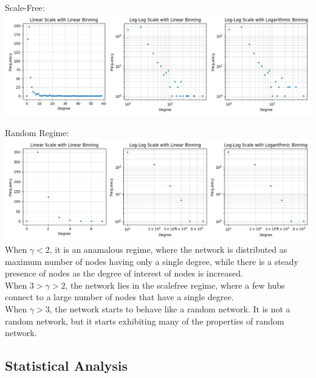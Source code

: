 \documentclass[11pt]{article}
\begin{document}
Scale-Free: \\
\includegraphics[scale=0.5]{dgsf.png}

Random Regime: \\
\includegraphics[scale=0.5]{dgrand.png}
\\
When $\gamma < 2$, it is an anamalous regime, where the network is distributed as maximum number of nodes having only a single degree, while there is a steady presence of nodes as the degree of interest of nodes is increased.
\\
When $3 > \gamma > 2$, the network lies in the scalefree regime, where a few hubs connect to a large number of nodes that have a single degree.
\\
When $\gamma > 3$, the network starts to behave like a random network. It is not a random network, but it starts exhibiting many of the properties of random network.

\subsection{Statistical Analysis}
\end{document}
